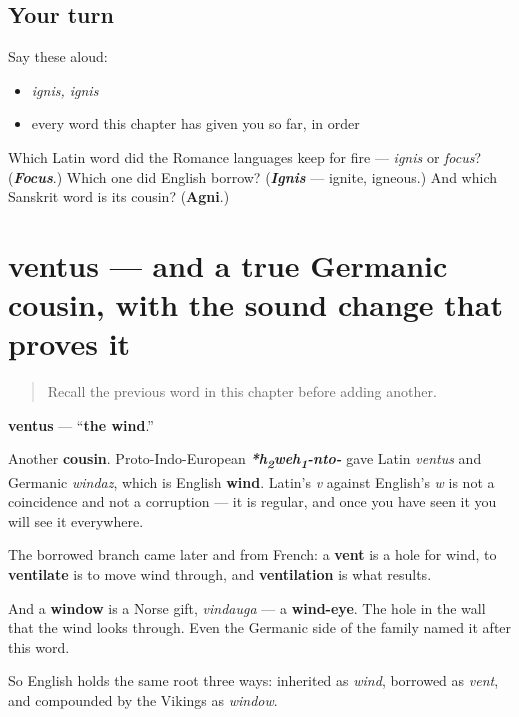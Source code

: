 \subsection*{Your turn}
Say these aloud:

\begin{itemize}
\raggedright
  \item \emph{ignis, ignis}
  \item every word this chapter has given you so far, in order
\end{itemize}

\begin{tcolorbox}[breakable,colback=teal!4,colframe=teal!35!black,title={Before you move on}]
Which Latin word did the Romance languages keep for fire — \emph{ignis} or \emph{focus}? (\emph{\textbf{Focus}}.) Which one did English borrow? (\emph{\textbf{Ignis}} — ignite, igneous.) And which Sanskrit word is its cousin? (\textbf{Agni}.)
\end{tcolorbox}
\section[ventus, ventī]{ventus — and a true Germanic cousin, with the sound change that proves it}

\label{lesson:LA-C45-ventus}



\begin{quote}
Recall the previous word in this chapter before adding another.
\end{quote}

\begin{cousinweb}
\textbf{ventus} — \textquotedblleft{}\textbf{the wind}.\textquotedblright{}

Another \textbf{cousin}. Proto-Indo-European \emph{\textbf{*h\textsubscript{2}weh\textsubscript{1}-nto-}} gave Latin \emph{ventus} and Germanic \emph{windaz}, which is English \textbf{wind}. Latin's \emph{v} against English's \emph{w} is not a coincidence and not a corruption — it is regular, and once you have seen it you will see it everywhere.

The borrowed branch came later and from French: a \textbf{vent} is a hole for wind, to \textbf{ventilate} is to move wind through, and \textbf{ventilation} is what results.

And a \textbf{window} is a Norse gift, \emph{vindauga} — a \textbf{wind-eye}. The hole in the wall that the wind looks through. Even the Germanic side of the family named it after this word.

So English holds the same root three ways: inherited as \emph{wind}, borrowed as \emph{vent}, and compounded by the Vikings as \emph{window}.
\end{cousinweb}

